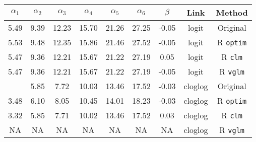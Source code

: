
\begin{tabular}{ccccccccc}
\toprule
$\alpha_1$ & $\alpha_2$ & $\alpha_3$ & $\alpha_4$ & $\alpha_5$ & $\alpha_6$ & $\beta$ & Link & Method\\
\midrule
5.49 & 9.39 & 12.23 & 15.70 & 21.26 & 27.25 & -0.05 & logit & Original \citep{candy1991modeling}\\
5.53 & 9.48 & 12.35 & 15.86 & 21.46 & 27.52 & -0.05 & logit & R \verb+optim+\\
5.47 & 9.36 & 12.21 & 15.67 & 21.22 & 27.19 & 0.05 & logit & R \verb+clm+\\
5.47 & 9.36 & 12.21 & 15.67 & 21.22 & 27.19 & -0.05 & logit & R \verb+vglm+\\
\addlinespace
3.32 & 5.85 & 7.72 & 10.03 & 13.46 & 17.52 & -0.03 & cloglog & Original \citep{candy1991modeling}\\
3.48 & 6.10 & 8.05 & 10.45 & 14.01 & 18.23 & -0.03 & cloglog & R \verb+optim+\\
3.32 & 5.85 & 7.71 & 10.02 & 13.46 & 17.52 & 0.03 & cloglog & R \verb+clm+\\
NA & NA & NA & NA & NA & NA & NA & cloglog & R \verb+vglm+\\
\bottomrule
\end{tabular}